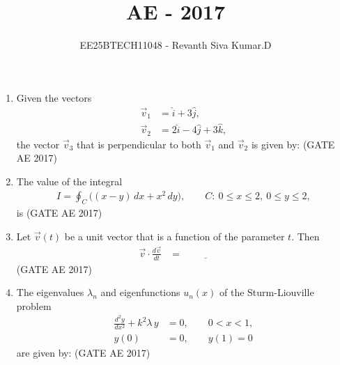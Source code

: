 \documentclass[journal,12pt,onecolumn]{IEEEtran}
\title{\LARGE \textbf{AE - 2017}}
\author{\Large EE25BTECH11048 - Revanth Siva Kumar.D}
\date{}
\theoremstyle{remark}
\begin{document}
\maketitle
\begin{flushleft}
\begin{enumerate}
\item
Given the vectors 
\begin{align*}
\vec v_{1} &= \hat{i}+3\hat{j}, \\
\vec v_{2} &= 2\hat{i}-4\hat{j}+3\hat{k},
\end{align*}
the vector $\vec v_{3}$ that is perpendicular to both $\vec v_{1}$ and $\vec v_{2}$ is given by:  
\hfill (GATE AE 2017)

\begin{enumerate}
\end{enumerate}

\item
The value of the integral
\begin{align*}
I=\oint_{C}\big((x-y)\,dx+x^{2}\,dy\big), \qquad
C:\ 0\le x\le 2,\ 0\le y\le 2,
\end{align*}
is \underline{\hspace{2cm}}  
\hfill (GATE AE 2017)

\item
Let $\vec v(t)$ be a unit vector that is a function of the parameter $t$. Then
\begin{align*}
\vec v\cdot \frac{d\vec v}{dt} &= \underline{\hspace{2cm}}
\end{align*}
\hfill (GATE AE 2017)

\item
The eigenvalues $\lambda_n$ and eigenfunctions $u_n(x)$ of the Sturm-Liouville problem
\begin{align*}
\frac{d^{2}y}{dx^{2}}+k^{2}\lambda\,y&=0,\qquad 0<x<1,\\
y(0)&=0,\qquad y(1)=0
\end{align*}
are given by:  
\hfill (GATE AE 2017)


\end{enumerate}
\end{flushleft}
\end{document}
